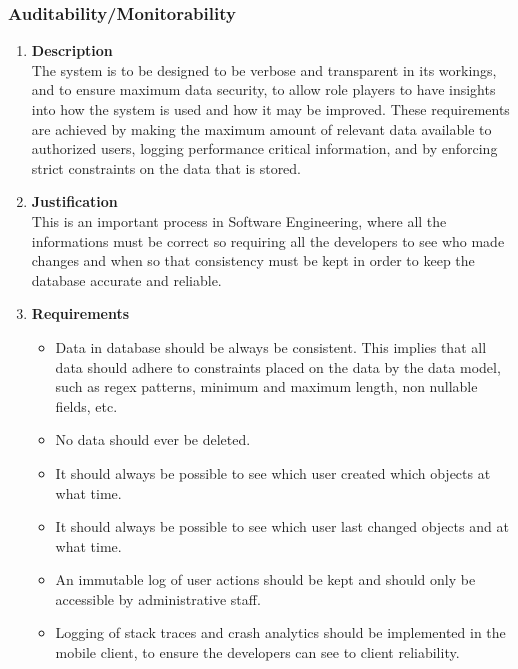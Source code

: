 \documentclass[a4paper,10pt]{article}
\begin{document}
\subsubsection{Auditability/Monitorability}
\begin{enumerate}
\item \textbf{Description} \\
The system is to be designed to be verbose and transparent in its workings, and to ensure maximum data security, to allow role players to have insights into how the system is used and how it may be improved. These requirements are achieved by making the maximum amount of relevant data available to authorized users, logging performance critical information, and by enforcing strict constraints on the data that is stored. 
\item \textbf{Justification} \\
This is an important process in Software Engineering, where all the informations must be correct so requiring all the developers to see who made changes and when so that consistency must be kept in order to keep the database accurate and reliable.
\item \textbf{Requirements}
	\begin{itemize}
		\item Data in database should be always be consistent. This implies that all data should adhere to constraints placed on the data by the data model, such as regex patterns, minimum and maximum length, non nullable fields, etc.
		\item No data should ever be deleted.
		\item It should always be possible to see which user created which objects at what time.
		\item It should always be possible to see which user last changed objects and at what time.
		\item An immutable log of user actions should be kept and should only be accessible by administrative staff.
		\item Logging of stack traces and crash analytics should be implemented in the mobile client, to ensure the developers can see to client reliability.
	\end{itemize}
\end{enumerate}
\end{document}
